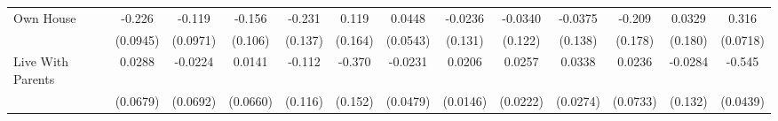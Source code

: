 {\begin{tabular}{l*{12}{c}}
\addlinespace
Own House   &      -0.226\sym{*}  &      -0.119         &      -0.156         &      -0.231         &       0.119         &      0.0448         &     -0.0236         &     -0.0340         &     -0.0375         &      -0.209         &      0.0329         &       0.316\sym{***}\\
            &    (0.0945)         &    (0.0971)         &     (0.106)         &     (0.137)         &     (0.164)         &    (0.0543)         &     (0.131)         &     (0.122)         &     (0.138)         &     (0.178)         &     (0.180)         &    (0.0718)         \\
\addlinespace
Live With Parents&      0.0288         &     -0.0224         &      0.0141         &      -0.112         &      -0.370\sym{*}  &     -0.0231         &      0.0206         &      0.0257         &      0.0338         &      0.0236         &     -0.0284         &      -0.545\sym{***}\\
            &    (0.0679)         &    (0.0692)         &    (0.0660)         &     (0.116)         &     (0.152)         &    (0.0479)         &    (0.0146)         &    (0.0222)         &    (0.0274)         &    (0.0733)         &     (0.132)         &    (0.0439)         \\
\bottomrule
\end{tabular}
}
